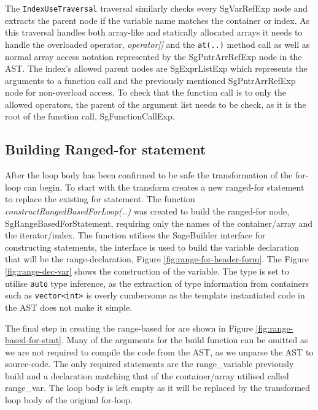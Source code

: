 \documentclass[bsc,frontabs,singlespacing,twoside,parskip,deptreport]{infthesis}
\begin{document}
The \texttt{IndexUseTraversal} traversal similarly checks every SgVarRefExp node and extracts the parent node if the variable name matches the container or index. As this traversal handles both array-like and statically allocated arrays it needs to handle the overloaded operator, \textit{operator[]} and the \texttt{at(..)} method call as well as normal array access notation represented by the SgPntrArrRefExp node in the AST. The index's allowed parent nodes are SgExprListExp which represents the arguments to a function call and the previously mentioned SgPntrArrRefExp node for non-overload access. To check that the function call is to only the allowed operators, the parent of the argument list needs to be check, as it is the root of the function call, SgFunctionCallExp.


\subsection{Building Ranged-for statement}\label{sec:build-range-for}
After the loop body has been confirmed to be safe the transformation of the for-loop can begin. To start with the transform creates a new ranged-for statement to replace the existing for statement. The function \textit{constructRangedBasedForLoop(..)} was created to build the ranged-for node, SgRangeBasedForStatement, requiring only the names of the container/array and the iterator/index. The function utilises the SageBuilder interface for constructing statements, the interface is used to build the variable declaration that will be the range-declaration, Figure \ref{fig:range-for-header-form}. The Figure \ref{fig:range-dec-var} shows the construction of the variable. The type is set to utilise \texttt{auto} type inference, as the extraction of type information from containers such as \texttt{vector<int>} is overly cumbersome as the template instantiated code in the AST does not make it simple. 

The final step in creating the range-based for are shown in Figure \ref{fig:range-based-for-stmt}. Many of the arguments for the build function can be omitted as we are not required to compile the code from the AST, as we unparse the AST to source-code. The only required statements are the range\_variable previously build and a declaration matching that of the container/array utilised called range\_var. The loop body is left empty as it will be replaced by the transformed loop body of the original for-loop.
\end{document}
